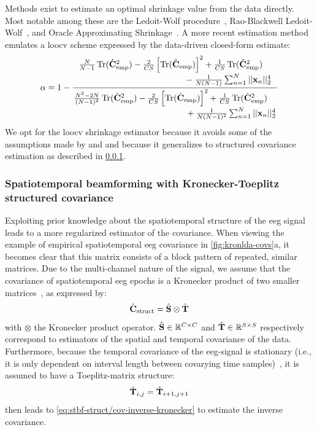 	Methods exist to estimate an optimal shrinkage value from the data directly.
	Most notable among these are the Ledoit-Wolf procedure~\cite{Ledoit2004},
	Rao-Blackwell Ledoit-Wolf~\cite{Chen2010}, and Oracle Approximating Shrinkage~\cite{Chen2010}.
  A more recent estimation method~\cite{Tong2018} emulates a \ac{loocv} scheme expressed by the data-driven closed-form
	estimate:
	\begin{equation}
		  \alpha =
		  1-\frac{%
        \splitfrac{
          \frac{N}{N-1}\Tr(\hat{\mat{C}}_\text{emp}^2)
          - \frac{2}{CS}\left[\Tr(\hat{\mat{C}}_\text{emp})\right]^2
          + \frac{1}{CS}\Tr(\hat{\mat{C}}_\text{emp}^2)
        }{
		  	  - \frac{1}{N(N-1)}\sum_{n=1}^N||\mat{x}_n||_2^4
        }
		  }{%
        \splitfrac{
          \frac{N^2 -2N}{(N-1)^2}\Tr(\hat{\mat{C}}_\text{emp}^2)
          - \frac{2}{CS}\left[\Tr(\hat{\mat{C}}_\text{emp})\right]^2
          + \frac{1}{CS}\Tr(\hat{\mat{C}}_\text{emp}^2)
        }{%
		  	  + \frac{1}{N(N-1)^2}\sum_{n=1}^N||\mat{x}_n||_2^4
        }
		  }
		\label{eq:loocv}
	\end{equation}
	We opt for the \ac{loocv} shrinkage estimator because it avoids some of the
	assumptions made by \textcite{Ledoit2004} and \textcite{Chen2010} and
	because it generalizes to structured covariance estimation as described in
	\cref{sec:stbf-struct/methods/structured-estimation}.

	\subsubsection{Spatiotemporal beamforming with Kronecker-Toeplitz structured covariance}
	\label{sec:stbf-struct/methods/structured-estimation}
	Exploiting prior knowledge about the spatiotemporal structure of the \ac{eeg} signal leads to a more regularized estimator of the covariance.
	When viewing the example of empirical spatiotemporal \ac{eeg} covariance in
	\cref{fig:kronlda-covs}a, it becomes clear that this matrix consists of a block pattern of repeated, similar matrices.
	Due to the multi-channel nature of the signal, we assume that the covariance of spatiotemporal \ac{eeg} epochs is a Kronecker
	product of two smaller
	matrices~\cite{Munck1992,DeMunck1999,Huizenga2002}, as expressed
	by:
	\begin{equation}
    \hat{\mathbf{C}}_\text{struct} = \hat{\mathbf{S}} \otimes \hat{\mathbf{T}}
		\label{eq:kronecker}
	\end{equation}
	with $\otimes$ the Kronecker product operator.
  $\hat{\mathbf{S}} \in \mathbb{R}^{C\times C}$ and $\hat{\mathbf{T}} \in \mathbb{R}^{S\times S}$ respectively correspond to estimators of the spatial and temporal covariance of the data.
	Furthermore, because the temporal covariance of the \ac{eeg}-signal is
	stationary (i.e., it is only dependent on interval length between covarying
	time samples)~\cite{Bijma2003}, it is assumed to have a Toeplitz-matrix structure:
	\begin{equation}
    \hat{\mathbf{T}}_{i,j} = \hat{\mathbf{T}}_{i+1,j+1}
		\label{eq:toeplitz}
	\end{equation}
	 then leads to
	\cref{eq:stbf-struct/cov-inverse-kronecker} to estimate the inverse
	covariance.

